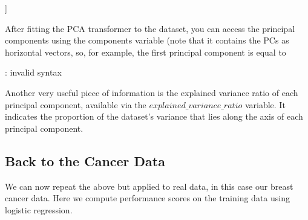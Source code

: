 \documentclass[letterpaper,10pt,english]{sphinxmanual}
\begin{document}
\begin{sphinxVerbatim}[commandchars=\\\{\}]
[[ 1.5378811  \PYGZhy{}0.94639099]
 [\PYGZhy{}0.86145244  0.89288636]
 [ 0.00445655  0.81633628]
 [\PYGZhy{}0.07145103 \PYGZhy{}1.00433417]
 [\PYGZhy{}2.03707133 \PYGZhy{}0.48476997]
 [\PYGZhy{}0.72174172 \PYGZhy{}1.4557763 ]
 [ 0.55854694  1.60673226]
 [\PYGZhy{}1.6999536   0.43766686]
 [ 1.10405456  0.31718909]
 [ 2.18673098 \PYGZhy{}0.17953942]]
\end{sphinxVerbatim}

After fitting the PCA transformer to the dataset, you can access the principal components using the
components variable (note that it contains the PCs as horizontal vectors, so, for example, the first
principal component is equal to

\begin{sphinxVerbatim}[commandchars=\\\{\}]
\PYG{p}{[} \PYG{p}{]}
\end{sphinxVerbatim}

\begin{sphinxVerbatim}[commandchars=\\\{\}]
    \PYG{p}{[} \PYG{p}{]}
: invalid syntax
\end{sphinxVerbatim}

Another very useful piece of information is the explained variance ratio of each principal component,
available via the \(explained\_variance\_ratio\) variable. It indicates the proportion of the dataset’s
variance that lies along the axis of each principal component.


\subsection{Back to the Cancer Data}
\label{\detokenize{chapter8:back-to-the-cancer-data}}
We can now repeat the above but applied to real data, in this case our breast cancer data.
Here we compute performance scores on the training data using logistic regression.
\end{document}
